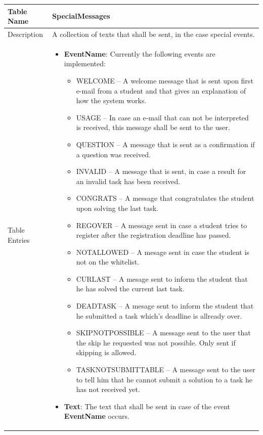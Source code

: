 \begin{tabular}{|p{3cm}|p{10cm}|}
\hline
Table Name & SpecialMessages \\
\hline
Description & A collection of texts that shall be sent, in the case special events. \\
\hline
Table Entries & \begin{itemize}
    \item {\bf EventName}: Currently the following events are implemented:
        \begin{itemize}
        \item WELCOME -- A welcome message that is sent upon first e-mail from a student and
                that gives an explanation of how the system works.
        \item USAGE -- In case an e-mail that can not be interpreted is received, this message
                shall be sent to the user.
        \item QUESTION -- A message that is sent as a confirmation if a question was received.
        \item INVALID -- A message that is sent, in case a result for an invalid task has
                been received.
        \item CONGRATS -- A message that congratulates the student upon solving the last task.
        \item REGOVER -- A message sent in case a student tries to register after the registration 
                deadline has passed.
        \item NOTALLOWED -- A mesage sent in case the student is not on the whitelist.
        \item CURLAST -- A mesage sent to inform the student that he has solved the current last task.
        \item DEADTASK -- A mesage sent to inform the student that he submitted a task which's deadline is allready over.
		\item SKIPNOTPOSSIBLE -- A message sent to the user that the skip he
								requested was not possible. Only sent if skipping is allowed.
		\item TASKNOTSUBMITTABLE -- A message sent to the user to tell him that
									he cannot submit a solution to a task he has
									not received yet.
        \end{itemize}
        \item {\bf Text}: The text that shall be sent in case of the event {\bf EventName} occurs.
    \end{itemize} \\
\hline
\end{tabular}

